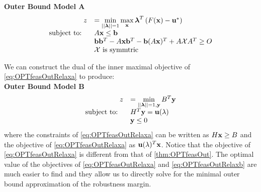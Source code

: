 \textbf{Outer Bound Model A}
\begin{equation}\label{eq:OPTfeasOutRelaxa}
\begin{array}{rl}
 \ z &=\min\limits_{||\boldsymbol{\lambda}||=1}\max\limits_{\mathbf{x}} \boldsymbol{\lambda}^T\left(F(\mathbf{x})-\mathbf{u}^*\right) \\
 \text{subject to: } \ & A\mathbf{x}\leq \mathbf{b} \\
 	&\mathbf{b}\mathbf{b}^T-A\mathbf{x}\mathbf{b}^T-\mathbf{b}(A\mathbf{x})^T+A\mathcal{X}A^T\geq O \\
 	&\mathcal{X} \text{ is symmtric}
\end{array}
\end{equation}


We can construct the dual of the inner maximal objective of \cref{eq:OPTfeasOutRelaxa} to produce: \\

\textbf{Outer Bound Model B} 
\begin{equation}\label{eq:OPTfeasOutRelaxb}
\begin{array}{rl}
\ z &=\min\limits_{||\boldsymbol{\lambda}||=1,\mathbf{y}}B^T\mathbf{y}  \\
 \text{subject to: } \ & H^T\mathbf{y}=\mathbf{u}(\lambda) \\
 & \mathbf{y}\leq 0
\end{array}
\end{equation}
where the constraints of \cref{eq:OPTfeasOutRelaxa} can be written as $H\mathbf{x}\geq B$ and the objective of \cref{eq:OPTfeasOutRelaxa} as $\mathbf{u}(\lambda)^T\mathbf{x}$. 
Notice that the objective of \cref{eq:OPTfeasOutRelaxa} is different from that of \cref{thm:OPTfeasOut}. 
The optimal value of the objectives of  \cref{eq:OPTfeasOutRelaxa} and \cref{eq:OPTfeasOutRelaxb} are much easier to find and they allow us to directly solve for the minimal outer bound approximation of the robustness margin. 

